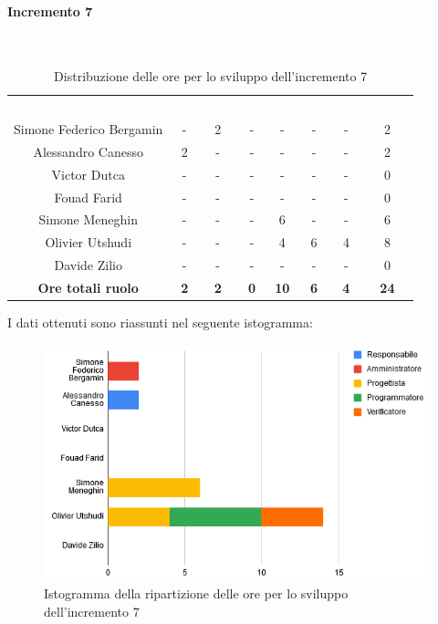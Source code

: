 \paragraph*{Incremento 7}\mbox{} \\
\begin{table}[H]
\centering\renewcommand{\arraystretch}{1.5}
\caption{Distribuzione delle ore per lo sviluppo dell'incremento 7}
\vspace{0.2cm}
\begin{tabular}{ c c c c c c c c }
\rowcolor{redafk}
\textcolor{white}{\textbf{Nominativo}} & \textcolor{white}{\textbf{Re}} &
\textcolor{white}{\textbf{Am}} & \textcolor{white}{\textbf{An}} &
\textcolor{white}{\textbf{Pt}} & \textcolor{white}{\textbf{Pm}} &
\textcolor{white}{\textbf{Ve}} & \textcolor{white}{\textbf{Totale}} \\
Simone Federico Bergamin & - & 2 & - & - & - & - & 2 \\
Alessandro Canesso & 2 & - & - & - & - & - & 2 \\
Victor Dutca & - & - & - & - & - & - & 0 \\
Fouad Farid & - & - & - & - & - & - & 0 \\
Simone Meneghin & - & - & - & 6 & - & - & 6 \\
Olivier Utshudi & - & - & - & 4 & 6 & 4 & 8 \\
Davide Zilio & - & - & - & - & - & - & 0 \\
\rowcolor{lastrowcolor}
\textbf{Ore totali ruolo} & \textbf{2} & \textbf{2} & \textbf{0} & \textbf{10} & \textbf{6} & \textbf{4} & \textbf{24} \\
\end{tabular}
\end{table}

I dati ottenuti sono riassunti nel seguente istogramma:
\begin{figure}[H]
\centering
\includegraphics[scale=0.60]{img/grafici/tabella_inc7.png}
\caption{Istogramma della ripartizione delle ore per lo sviluppo dell'incremento 7}
\end{figure}

